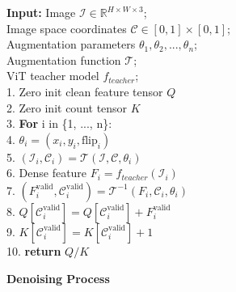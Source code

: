\renewcommand{\figurename}{Algorithm}
\begin{figure}
\vspace{-0.5em}
\begin{minipage}{1.0\linewidth}
  \begin{algorithm}[H]
  \caption{\textbf{Denoising Process}}
  \label{distill_algo}
    \textbf{Input:} Image $\mathcal{I}\in\mathbb{R}^{H\times W \times 3}$;\\
    \hspace{10.7mm}Image space coordinates $\mathcal{C}\in [0,1] \times [0,1]$;\\
    \hspace{10.7mm}Augmentation parameters $\theta_{1}, \theta_{2},..., \theta_{n}$;\\ 
    \hspace{10.7mm}Augmentation function $\mathcal{T}$;\\
    \hspace{10.7mm}ViT teacher model $f_{teacher}$; 
\\
1. Zero init clean feature tensor $Q$\\
2. Zero init count tensor $K$\\
3. \textbf{For} i in \{1, ..., n\}:\\
4. \hspace{6.0mm} $\theta_i =(x_i, y_i, \text{flip}_i)$ 
\\
5. \hspace{6.0mm} $(\mathcal{I}_i,\mathcal{C}_i) = \mathcal{T}(\mathcal{I}, \mathcal{C}, \theta_i)$\\
6. \hspace{6.0mm} Dense feature $F_i = f_{teacher}(\mathcal{I}_i)$\\
7. \hspace{6.0mm}$(F^\text{valid}_i,\mathcal{C}^\text{valid}_i) = \mathcal{T}^{-1}(F_i, \mathcal{C}_i, \theta_i)$\\
8. \hspace{6.0mm}$Q[\mathcal{C}^\text{valid}_i]=Q[\mathcal{C}^\text{valid}_i]+F^\text{valid}_i$\\
9. \hspace{6.0mm}$K[\mathcal{C}^\text{valid}_i]=K[\mathcal{C}^\text{valid}_i]+1$\\
10. \textbf{return} $Q/K$
  \end{algorithm}
\end{minipage}\vspace{-0.1em}
\end{figure}
\vspace{-0.5em}
\renewcommand{\figurename}{Figure}

